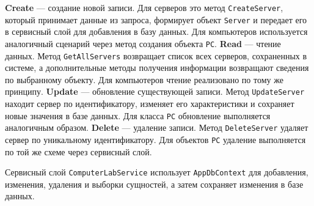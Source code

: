 \documentclass[oneside,14pt,a4paper]{extarticle}
\renewcommand{\item}{\itemindent1.25cm\itemold}
\begin{document}
  \begin{itemize}
    \item[--] \textbf{Create} --- создание новой записи. Для серверов это метод \texttt{CreateServer}, который принимает данные из запроса, формирует объект \texttt{Server} и передает его в сервисный слой для добавления в базу данных. Для компьютеров используется аналогичный сценарий через метод создания объекта \texttt{PC}.
    \item[--] \textbf{Read} --- чтение данных. Метод \texttt{GetAllServers} возвращает список всех серверов, сохраненных в системе, а дополнительные методы получения информации возвращают сведения по выбранному объекту. Для компьютеров чтение реализовано по тому же принципу.
    \item[--] \textbf{Update} --- обновление существующей записи. Метод \texttt{UpdateServer} находит сервер по идентификатору, изменяет его характеристики и сохраняет новые значения в базе данных. Для класса \texttt{PC} обновление выполняется аналогичным образом.
    \item[--] \textbf{Delete} --- удаление записи. Метод \texttt{DeleteServer} удаляет сервер по уникальному идентификатору. Для объектов \texttt{PC} удаление выполняется по той же схеме через сервисный слой.
  \end{itemize}

  Сервисный слой \texttt{ComputerLabService} использует \texttt{AppDbContext} для добавления, изменения, удаления и выборки сущностей, а затем сохраняет изменения в базе данных.
  
\end{document}
